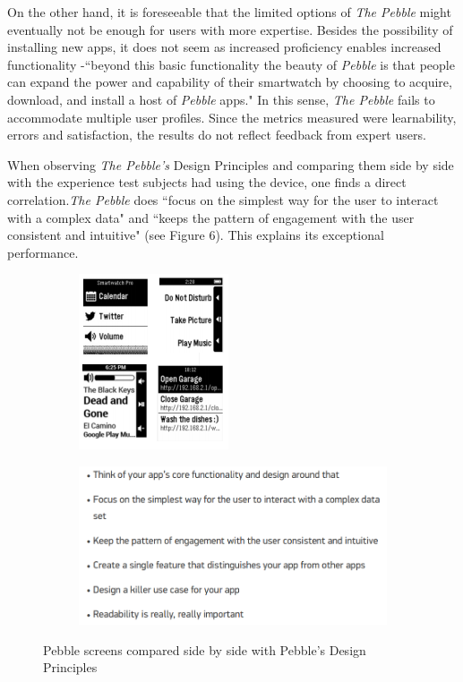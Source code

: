 \documentclass[11pt,a4paper]{scrartcl}
\begin{document}
On the other hand, it is foreseeable that the limited options of \textit{The Pebble} might eventually not be enough for users with more expertise. Besides the possibility of installing new apps, it does not seem as increased proficiency enables increased functionality -``beyond this basic functionality the beauty of \textit{Pebble} is that people can expand the power and capability of their smartwatch by choosing to acquire, download, and install a host of \textit{Pebble} apps."\cite{pebble01}  In this sense, \textit{The Pebble} fails to accommodate multiple user profiles. Since the metrics measured were learnability, errors and satisfaction, the results do not reflect feedback from expert users. 

When observing \textit{The Pebble's} Design Principles and comparing them side by side with the experience test subjects had using the device, one finds a direct correlation.\textit{The Pebble} does ``focus on the simplest way for the user to interact with a complex data" and ``keeps the pattern of engagement with the user consistent and intuitive" (see Figure 6). This explains its exceptional performance. 

\begin{figure}[!t]
\centering
\begin{subfigure}{.5\textwidth}
  \centering
  \caption{}
  \includegraphics[height=.52\linewidth]{pebble_screens.png}
\end{subfigure}%
\begin{subfigure}{.5\textwidth}
  \centering
  \caption{}
  \includegraphics[width=1\linewidth]{pebble_designprinciples}
\end{subfigure}
\caption{Pebble screens compared side by side with Pebble's Design Principles}
\end{figure}
\end{document}
